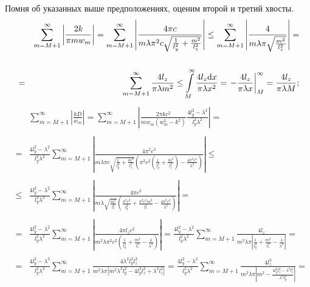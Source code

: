 Помня об указанных выше предположениях, оценим второй и третий хвосты.
\begin{eqnarray*}
  & & \sum \limits_{m=M+1}^{\infty} \left| \frac{2 k}{\pi m w_m} \right| =
  \sum \limits_{m=M+1}^{\infty} \left| \frac{4 \pi c}{m \lambda \pi^2 c \sqrt{\frac{1}{l_y^2} + \frac{m^2}{l_z^2}}} \right| \leq
  \sum \limits_{m=M+1}^{\infty} \left| \frac{4}{m \lambda \pi \sqrt{\frac{m^2}{l_z^2}}} \right| =\\
  \\
  &=&\sum \limits_{m=M+1}^{\infty} \frac{4 l_z}{\pi \lambda m^2} \leq
  \int \limits_M^{\infty} \frac{4 l_z \mathrm{d} x}{\pi \lambda x^2} =
  \left. - \frac{4 l_z}{\pi \lambda x} \right|_M^{\infty} =
  \frac{4 l_z}{\pi \lambda M};
\end{eqnarray*}
\begin{eqnarray*}
  &&\sum \limits_{m=M+1}^{\infty} \left| \frac{k D}{w_m} \right| =
  \sum \limits_{m=M+1}^{\infty} \left| \frac{2 \pi k c^2}{m w_m (w_m^2 - k^2)} \frac{4l_y^2 - \lambda^2}{l_y^2\lambda^2} \right| =\\
  \\
  &=& \frac{4l_y^2 - \lambda^2}{l_y^2\lambda^2} \sum \limits_{m=M+1}^{\infty} \left| \frac{4 \pi^2 c^3}{m \lambda \pi c \sqrt{\frac{1}{l_y^2} + \frac{m^2}{l_z^2}} \left( \pi^2 c^2 \left( \frac{1}{l_y^2} + \frac{m^2}{l_z^2} \right) - \frac{4 \pi^2 c^2}{\lambda^2} \right) } \right| \leq \\
  \\
  &\leq& \frac{4l_y^2 - \lambda^2}{l_y^2\lambda^2} \sum \limits_{m=M+1}^{\infty} \left| \frac{4 \pi c^2}{m \lambda \sqrt{\frac{m^2}{l_z^2}} \left( \frac{\pi^2 c^2}{l_y^2} + \frac{\pi^2 c^2 m^2}{l_z^2} - \frac{4 \pi^2 c^2}{\lambda^2} \right) } \right| =\\
  \\
  &=& \frac{4l_y^2 - \lambda^2}{l_y^2\lambda^2} \sum \limits_{m=M+1}^{\infty} \left| \frac{4 \pi l_z c^2}{m^2 \lambda \pi^2 c^2 \left( \frac{1}{l_y^2} + \frac{m^2}{l_z^2} - \frac{4}{\lambda^2} \right) } \right| = \frac{4l_y^2 - \lambda^2}{l_y^2\lambda^2} \sum \limits_{m=M+1}^{\infty}  \frac{4 l_z}{m^2 \lambda \pi \left| \frac{1}{l_y^2} + \frac{m^2}{l_z^2} - \frac{4}{\lambda^2} \right|} =\\
  \\
  &=& \frac{4l_y^2 - \lambda^2}{l_y^2\lambda^2} \sum \limits_{m=M+1}^{\infty}  \frac{4 \lambda^2 l_y^2 l_z^3}{m^2 \lambda \pi \left| m^2 \lambda^2 l_y^2 - 4 l_y^2 l_z^2 + \lambda^2 l_z^2 \right|} = \frac{4l_y^2 - \lambda^2}{l_y^2\lambda^2} \sum \limits_{m=M+1}^{\infty}  \frac{4 l_z^3}{m^2 \lambda \pi \left| m^2 - \frac{4 l_y^2 l_z^2 - \lambda^2 l_z^2}{\lambda^2 l_y^2} \right|} =\\

\end{eqnarray*}
